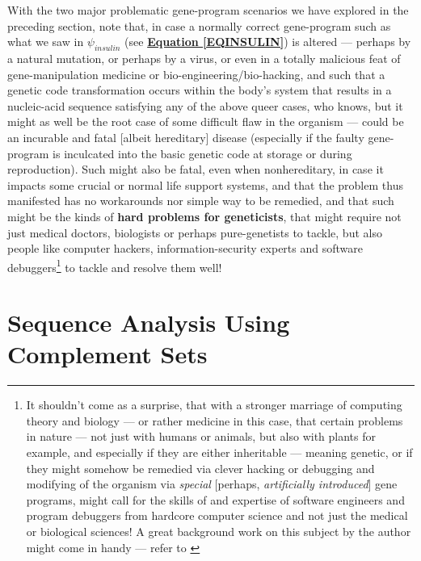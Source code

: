 \documentclass[a4paper, 18pt]{book} %
\begin{document}
With the two major problematic gene-program scenarios we have explored in the preceding section, note that, in case a normally correct gene-program such as what we saw in $\psi_{insulin}$ (see \textbf{\hyperref[EQINSULIN]{Equation \ref{EQINSULIN}}}) is altered --- perhaps by a natural mutation, or perhaps by a virus, or even in a totally malicious feat of gene-manipulation medicine or bio-engineering/bio-hacking, and such that a genetic code transformation occurs within the body's system that results in a nucleic-acid sequence satisfying any of the above queer cases, who knows, but it might as well be the root case of some difficult flaw in the organism --- could be an incurable and fatal [albeit hereditary] disease (especially if the faulty gene-program is inculcated into the basic genetic code at storage or during reproduction). Such might also be fatal, even when nonhereditary, in case it impacts some crucial or normal life support systems, and that the problem thus manifested has no workarounds nor simple way to be remedied, and that such might be the kinds of \textbf{hard problems for geneticists}, that might require not just medical doctors, biologists or perhaps pure-genetists to tackle, but also people like computer hackers, information-security experts and software debuggers\footnote{It shouldn't come as a surprise, that with a stronger marriage of computing theory and biology --- or rather medicine in this case, that certain problems in nature --- not just with humans or animals, but also with plants for example, and especially if they are either inheritable --- meaning genetic, or if they might somehow be remedied via clever hacking or debugging and modifying of the organism via \textit{special} [perhaps, \textit{artificially introduced}] gene programs, might call for the skills of and expertise of software engineers and program debuggers from hardcore computer science and not just the medical or biological sciences! A great background work on this subject by the author might come in handy --- refer to \cite{Lutalo2025debug}} to tackle and resolve them well!



\chapter{Sequence Analysis Using Complement Sets}
\label{SEC3A}
\end{document}
